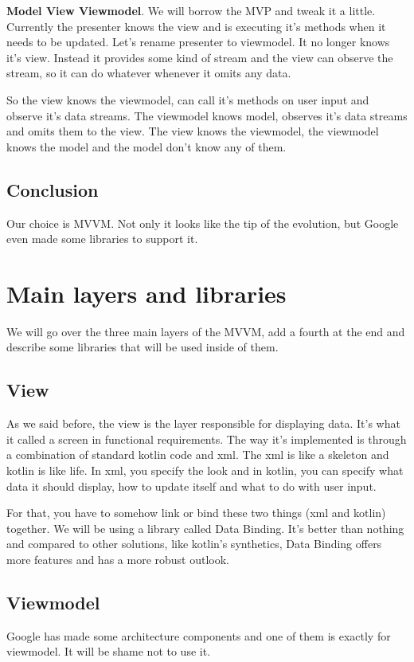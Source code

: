 \textbf{Model View Viewmodel}.
We will borrow the MVP and tweak it a little. Currently the presenter knows the view and is executing it's methods when it needs to be updated.
Let's rename presenter to viewmodel. It no longer knows it's view.
Instead it provides some kind of stream and the view can observe the stream, so it can do whatever whenever it omits any data.

So the view knows the viewmodel, can call it's methods on user input and observe it's data streams.
The viewmodel knows model, observes it's data streams and omits them to the view.
The view knows the viewmodel, the viewmodel knows the model and the model don't know any of them.

\subsection{Conclusion}
Our choice is MVVM. Not only it looks like the tip of the evolution, but Google even made some libraries to support it.

\section{Main layers and libraries}
We will go over the three main layers of the MVVM, add a fourth at the end and describe some libraries that will be used inside of them.

\subsection{View}
As we said before, the view is the layer responsible for displaying data. It's what it called a screen in functional requirements.
The way it's implemented is through a combination of standard kotlin code and xml.
The xml is like a skeleton and kotlin is like life. In xml, you specify the look and in kotlin, you can specify what data it should display, how to update itself and what to do with user input.

For that, you have to somehow link or bind these two things (xml and kotlin) together.
We will be using a library called Data Binding. It's better than nothing and compared to other solutions, like kotlin's synthetics, Data Binding offers more features and has a more robust outlook.

\subsection{Viewmodel}
Google has made some architecture components and one of them is exactly for viewmodel.
It will be shame not to use it.

